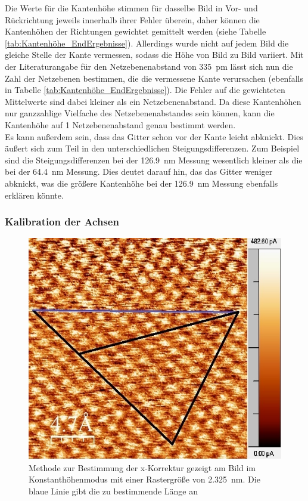 \documentclass[12pt,a4paper]{article}
\begin{document}
Die Werte für die Kantenhöhe stimmen für dasselbe Bild in Vor- und Rückrichtung jeweils innerhalb ihrer Fehler überein, daher können die Kantenhöhen der Richtungen gewichtet gemittelt werden (siehe Tabelle \ref{tab:Kantenhöhe_EndErgebnisse}). Allerdings wurde nicht auf jedem Bild die gleiche Stelle der Kante vermessen, sodass die Höhe von Bild zu Bild variiert. Mit der Literaturangabe für den Netzebenenabstand von \SI{335}{pm} lässt sich nun die Zahl der Netzebenen bestimmen, die die vermessene Kante verursachen (ebenfalls in Tabelle \ref{tab:Kantenhöhe_EndErgebnisse}). Die Fehler auf die gewichteten Mittelwerte sind dabei kleiner als ein Netzebenenabstand. Da diese Kantenhöhen nur ganzzahlige Vielfache des Netzebenenabstandes sein können, kann die Kantenhöhe auf 1 Netzebenenabstand genau bestimmt werden.\\
Es kann außerdem sein, dass das Gitter schon vor der Kante leicht abknickt. Dies äußert sich zum Teil in den unterschiedlichen Steigungsdifferenzen. Zum Beispiel sind die Steigungsdifferenzen bei der \SI{126,9}{nm} Messung wesentlich kleiner als die bei der \SI{64,4}{nm} Messung. Dies deutet darauf hin, das das Gitter weniger abknickt, was die größere Kantenhöhe bei der \SI{126,9}{nm} Messung ebenfalls erklären könnte.

\subsubsection{Kalibration der Achsen}

\begin{figure}
\centering
\includegraphics[scale=0.8]{Bilder/Atome/hoch2_h_scale.jpg}
\caption{Methode zur Bestimmung der x-Korrektur gezeigt am Bild im Konstanthöhenmodus mit einer Rastergröße von \SI{2,325}{nm}. Die blaue Linie gibt die zu bestimmende Länge an}
\label{fig:hoch2_h}
\end{figure}
\end{document}
